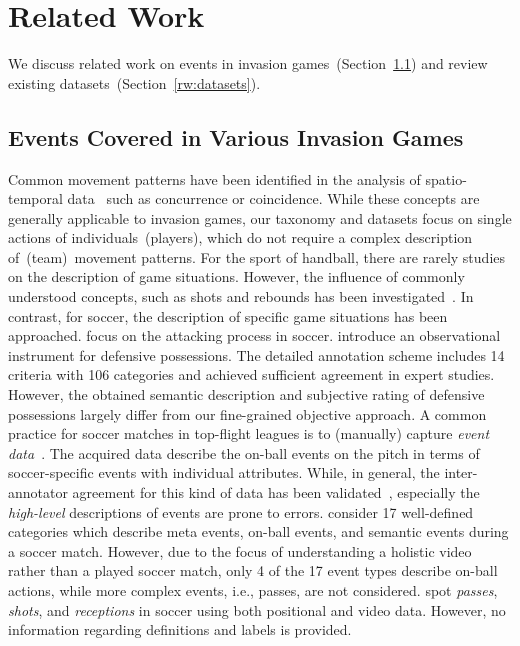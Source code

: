 \section{Related Work}\label{sec:rw}

We discuss related work on events in invasion games~(Section~\ref{rw:event_types}) and review existing datasets~(Section~\ref{rw:datasets}).

\subsection{Events Covered in Various Invasion Games}\label{rw:event_types} %

Common movement patterns have been identified in the analysis of spatio-temporal data~\cite{dodge2008towards} such as concurrence or coincidence.
While these concepts are generally applicable to invasion games, %
our taxonomy and datasets focus on single actions of individuals~(players), which do not require a complex description of~(team)~movement patterns.
For the sport of handball, there are rarely studies on the description of game situations.
However, the influence of commonly understood concepts, such as shots and rebounds has been investigated~\cite{burger2013analysis}.
In contrast, for soccer, the description of specific game situations has been approached. \citet{kim2019attacking} focus on the attacking process in soccer.
\citet{fernandes2019design} introduce an observational instrument for defensive possessions. The detailed annotation scheme includes 14 criteria with 106 categories %
and achieved sufficient agreement in expert studies. However, the obtained semantic description and subjective rating of defensive possessions largely differ from our fine-grained objective approach. 
A common practice for soccer matches in top-flight leagues is to (manually) capture \textit{event data}~\cite{opta, pappalardo2019public}. 
The acquired data describe the on-ball events on the pitch in terms of soccer-specific events with individual attributes. 
While, in general, the inter-annotator agreement for %
this kind of data has been validated~\cite{liu2013reliability}, especially the \textit{high-level} descriptions of events are prone to errors. 
\citet{deliege2020soccernet} consider 17 well-defined categories which describe meta events, on-ball events, and semantic events during a soccer match. However, due to the focus of understanding a holistic video rather than a played soccer match, only 4 of the 17 event types describe on-ball actions, while more complex events, i.e., passes, are not considered. 
\citet{sanford2020group} spot \textit{passes}, \textit{shots}, and \textit{receptions} in soccer using both positional and video data. However, no information regarding definitions and labels is provided.

